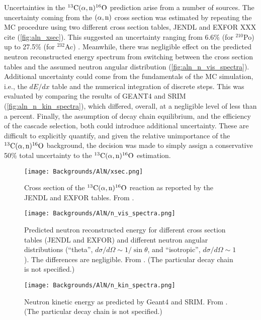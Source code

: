 \documentclass[../thesis.tex]{subfiles}
\begin{document}
Uncertainties in the $^{13}\mathrm{C}(\alpha, \mathrm{n})^{16}\mathrm{O}$ prediction arise from a number of sources. The uncertainty coming from the $(\alpha,\mathrm{n})$ cross section was estimated by repeating the MC procedure using two different cross section tables, JENDL and EXFOR XXX cite (\autoref{fig:aln_xsec}). This suggested an uncertainty ranging from 6.6\% (for $^{210}$Po) up to 27.5\% (for $^{232}$Ac) \cite{Zhao_2014}. Meanwhile, there was negligible effect on the predicted neutron reconstructed energy spectrum from switching between the cross section tables and the assumed neutron angular distribution (\autoref{fig:aln_n_vis_spectra}). Additional uncertainty could come from the fundamentals of the MC simulation, i.e., the $dE/dx$ table and the numerical integration of discrete steps. This was evaluated by comparing the results of GEANT4 and SRIM (\autoref{fig:aln_n_kin_spectra}), which differed, overall, at a negligible level of less than a percent. Finally, the assumption of decay chain equilibrium, and the efficiency of the cascade selection, both could introduce additional uncertainty. These are difficult to explicitly quantify, and given the relative unimportance of the $^{13}\mathrm{C}(\alpha, \mathrm{n})^{16}\mathrm{O}$ background, the decision was made to simply assign a conservative 50\% total uncertainty to the $^{13}\mathrm{C}(\alpha, \mathrm{n})^{16}\mathrm{O}$ estimation.

\begin{figure}[ht]
  \texttt{[image: Backgrounds/AlN/xsec.png]}
  \caption{Cross section of the $^{13}\mathrm{C}(\alpha, \mathrm{n})^{16}\mathrm{O}$ reaction as reported by the JENDL and EXFOR tables. From \cite{Zhao_2014}.}
  \label{fig:aln_xsec}
\end{figure}

\begin{figure}[ht]
  \texttt{[image: Backgrounds/AlN/n\_vis\_spectra.png]}
  \caption{Predicted neutron reconstructed energy for different cross section tables (JENDL and EXFOR) and different neutron angular distributions (``theta'', $d\sigma/d\Omega \sim 1/\sin\theta$, and ``isotropic'', $d\sigma/d\Omega \sim 1$). The differences are negligible. From \cite{Zhao_2014}. (The particular decay chain is not specified.)}
  \label{fig:aln_n_vis_spectra}
\end{figure}

\begin{figure}[ht]
  \texttt{[image: Backgrounds/AlN/n\_kin\_spectra.png]}
  \caption{Neutron kinetic energy as predicted by Geant4 and SRIM. From \cite{Zhao_2014}. (The particular decay chain is not specified.)}
  \label{fig:aln_n_kin_spectra}
\end{figure}

\end{document}
